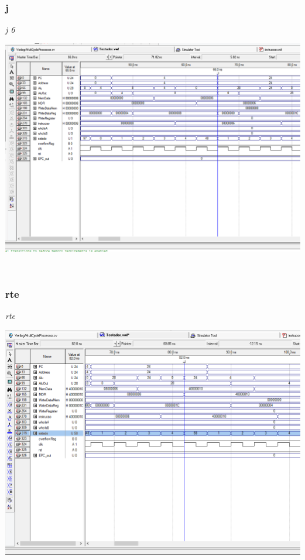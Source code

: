 \documentclass{article}
\begin{document}
    \\
    \subsubsection{j} 
    {\it j 6}\\
    \begin{center}
        \includegraphics[scale=0.25]{j.PNG}
    \end{center}
    
    \\
    \subsubsection{rte} 
    {\it rte}\\
    \begin{center}
        \includegraphics[scale=0.25]{rte.PNG}
    \end{center}
    
\end{document}
